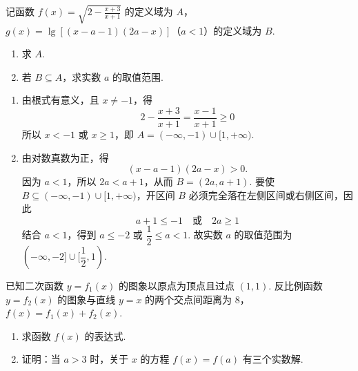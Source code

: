 \begin{problem}
记函数 \( f(x) = \sqrt{2 - \frac{x + 3}{x + 1}} \) 的定义域为 \(A\)，\( g(x) = \lg [(x - a - 1)(2a - x)]\)（\(a < 1\)）的定义域为 \(B\).

\begin{enumerate}
\item 求 \(A\).
\item 若 \(B \subseteq A\)，求实数 \(a\) 的取值范围.
\end{enumerate}
\end{problem}

\begin{solution}
\begin{enumerate}
\item 由根式有意义，且 \(x\neq-1\)，得
\[
2-\frac{x+3}{x+1}=\frac{x-1}{x+1}\geqslant0
\]
所以 \(x<-1\) 或 \(x\geqslant1\)，即 \(A=(-\infty,-1)\cup[1,+\infty)\).

\item 由对数真数为正，得
\[
(x-a-1)(2a-x)>0.
\]
因为 \(a<1\)，所以 \(2a<a+1\)，从而 \(B=(2a,a+1)\). 要使 \(B\subseteq(-\infty,-1)\cup[1,+\infty)\)，开区间 \(B\) 必须完全落在左侧区间或右侧区间，因此
\[
a+1\leqslant-1\quad\text{或}\quad 2a\geqslant1
\]
结合 \(a<1\)，得到 \(a\leqslant-2\) 或 \(\dfrac{1}{2}\leqslant a<1\). 故实数 \(a\) 的取值范围为 \((-\infty,-2]\cup[\dfrac{1}{2},1)\).
\end{enumerate}
\end{solution}

\begin{problem}
已知二次函数 \( y = f_{1}(x) \) 的图象以原点为顶点且过点 \((1,1)\). 反比例函数 \( y = f_{2}(x) \) 的图象与直线 \( y = x \) 的两个交点间距离为 \(8\)，\( f(x) = f_{1}(x) + f_{2}(x) \).

\begin{enumerate}
\item 求函数 \( f(x) \) 的表达式.
\item 证明：当 \(a > 3\) 时，关于 \(x\) 的方程 \(f(x) = f(a)\) 有三个实数解.
\end{enumerate}
\end{problem}

